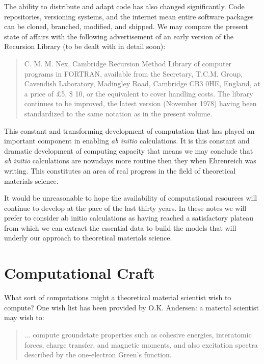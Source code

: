 
The ability to distribute and adapt code has also changed significantly. 
Code repositories, versioning systems, and the internet mean entire software
packages can be cloned, branched, modified, and shipped. We may compare the
present state of affairs with the following advertisement of an early version
of the Recursion Library (to be dealt with in detail soon):

\begin{quote}
C. M. M. Nex, Cambridge Recursion Method Library of computer
programs in FORTRAN, available from the Secretary, T.C.M. Group,
Cavendish Laboratory, Madingley Road, Cambridge CB3 0HE, England,
at a price of \pounds 5, \$ 10, or the equivalent to cover handling costs.
The library continues to be improved, the latest version
(November 1978) having been standardized to the same notation
as in the present volume.
\end{quote}

This constant and transforming development of computation that 
has played an important component in enabling {\it ab initio} 
calculations. 
It is this constant and dramatic development of computing capacity that 
means we may conclude that {\it ab initio} 
calculations are nowadays more routine then they when Ehrenreich was writing.
This constitutes an area of real progress in the field of theoretical
materials science. 

It would be unreasonable to hope 
the availability of computational resources will continue to develop
at the pace of the last thirty years. In these notes we will prefer to
consider ab initio calculations as having reached a satisfactory
plateau from which we can extract the essential data to build
the models that will underly our approach to theoretical
materials science.

\section{Computational Craft}
What sort of computations might a theoretical material scientist
wish to compute? One wish list has been provided by O.K. Andersen:
a material scientist may wish to:
\begin{quote}
... compute groundstate properties such as cohesive energies, interatomic forces, 
charge transfer, and magnetic moments, and also excitation spectra described 
by the one-electron Green's function\cite{anderson75}.
\end{quote}

